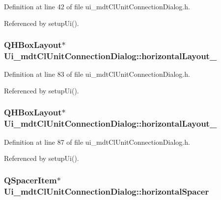 Definition at line 42 of file ui\-\_\-mdt\-Cl\-Unit\-Connection\-Dialog.\-h.



Referenced by setup\-Ui().

\hypertarget{class_ui__mdt_cl_unit_connection_dialog_a78e9f20d85dd708397b44151debdbf25}{
\subsubsection[{horizontal\-Layout\-\_\-8}]{\setlength{\rightskip}{0pt plus 5cm}Q\-H\-Box\-Layout$\ast$ Ui\-\_\-mdt\-Cl\-Unit\-Connection\-Dialog\-::horizontal\-Layout\-\_}}\label{class_ui__mdt_cl_unit_connection_dialog_a78e9f20d85dd708397b44151debdbf25}


Definition at line 83 of file ui\-\_\-mdt\-Cl\-Unit\-Connection\-Dialog.\-h.



Referenced by setup\-Ui().

\hypertarget{class_ui__mdt_cl_unit_connection_dialog_a449b34bba644bb9bcf13ba4b58a22e5d}{
\subsubsection[{horizontal\-Layout\-\_\-9}]{\setlength{\rightskip}{0pt plus 5cm}Q\-H\-Box\-Layout$\ast$ Ui\-\_\-mdt\-Cl\-Unit\-Connection\-Dialog\-::horizontal\-Layout\-\_}}\label{class_ui__mdt_cl_unit_connection_dialog_a449b34bba644bb9bcf13ba4b58a22e5d}


Definition at line 87 of file ui\-\_\-mdt\-Cl\-Unit\-Connection\-Dialog.\-h.



Referenced by setup\-Ui().

\hypertarget{class_ui__mdt_cl_unit_connection_dialog_aea88a25a7d7660378eb7060bc297d7cd}{
\subsubsection[{horizontal\-Spacer}]{\setlength{\rightskip}{0pt plus 5cm}Q\-Spacer\-Item$\ast$ Ui\-\_\-mdt\-Cl\-Unit\-Connection\-Dialog\-::horizontal\-Spacer}}\label{class_ui__mdt_cl_unit_connection_dialog_aea88a25a7d7660378eb7060bc297d7cd}



